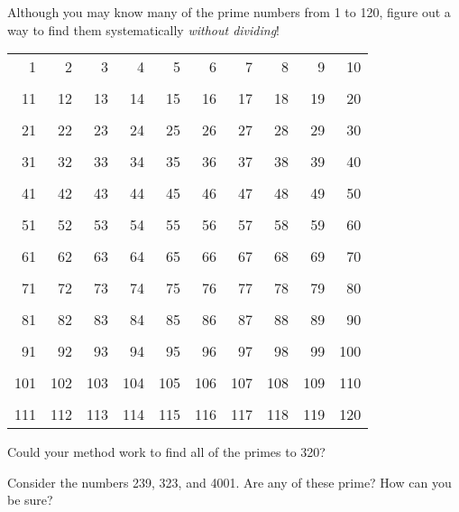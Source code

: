 \documentclass{ximera}
\begin{document}
\begin{problem}
Although you may know many of the prime numbers from 1 to 120, figure
out a way to find them systematically  \textit{without dividing}!

\vspace*{1cm}

\begin{tabular}{r r r r r r r r r r}

  1 &   2 &   3 &   4 &   5 &   6 &   7 &   8 &   9 &  10\\
  \\
 11 &  12 &  13 &  14 &  15 &  16 &  17 &  18 &  19 &  20\\
 \\
 21 &  22 &  23 &  24 &  25 &  26 &  27 &  28 &  29 &  30\\
 \\
 31 &  32 &  33 &  34 &  35 &  36 &  37 &  38 &  39 &  40\\
 \\
 41 &  42 &  43 &  44 &  45 &  46 &  47 &  48 &  49 &  50\\
 \\
 51 &  52 &  53 &  54 &  55 &  56 &  57 &  58 &  59 &  60\\
 \\
 61 &  62 &  63 &  64 &  65 &  66 &  67 &  68 &  69 &  70\\
 \\
 71 &  72 &  73 &  74 &  75 &  76 &  77 &  78 &  79 &  80\\
 \\
 81 &  82 &  83 &  84 &  85 &  86 &  87 &  88 &  89 &  90\\
 \\
 91 &  92 &  93 &  94 &  95 &  96 &  97 &  98 &  99 & 100\\
 \\
101 & 102 & 103 & 104 & 105 & 106 & 107 & 108 & 109 & 110\\
\\
111 & 112 & 113 & 114 & 115 & 116 & 117 & 118 & 119 & 120\\
\end{tabular}

\end{problem}
\begin{problem}
 Could your method work to find all of the primes to 320?
\end{problem}



\begin{problem}
Consider the numbers 239, 323, and 4001. Are any of these prime? How
can you be sure?
\end{problem}
\end{document}
